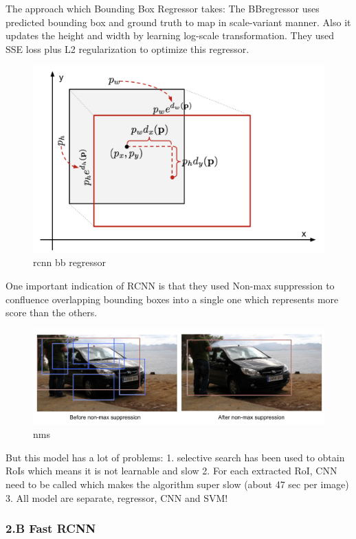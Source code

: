 \documentclass[11pt]{article}
\makeatletter
\def\maxwidth{\ifdim\Gin@nat@width>\linewidth\linewidth
    \else\Gin@nat@width\fi}
\let\Oldincludegraphics\includegraphics
\renewcommand{\includegraphics}[1]{\Oldincludegraphics[width=.8\maxwidth]{#1}}
\makeatother
\begin{document}
The approach which Bounding Box Regressor takes: The BBregressor uses
predicted bounding box and ground truth to map in scale-variant manner.
Also it updates the height and width by learning log-scale
transformation. They used SSE loss plus L2 regularization to optimize
this regressor.

\begin{figure}
\centering
\includegraphics{wiki/rcnn3.png}
\caption{rcnn bb regressor}
\end{figure}

One important indication of RCNN is that they used Non-max suppression
to confluence overlapping bounding boxes into a single one which
represents more score than the others.

\begin{figure}
\centering
\includegraphics{wiki/nms.png}
\caption{nms}
\end{figure}

But this model has a lot of problems: 1. selective search has been used
to obtain RoIs which means it is not learnable and slow 2. For each
extracted RoI, CNN need to be called which makes the algorithm super
slow (about 47 sec per image) 3. All model are separate, regressor, CNN
and SVM!

    \hypertarget{b-fast-rcnn}{%
\subsubsection{2.B Fast RCNN}\label{b-fast-rcnn}}
\end{document}
